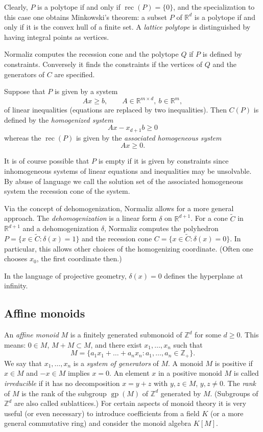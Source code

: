 \documentclass[12pt,a4paper]{scrartcl}
\theoremstyle{definition}
\def\ZZ{{\mathbb Z}}
\def\RR{{\mathbb R}}
\DeclareMathOperator{\gp}{gp}
\DeclareMathOperator{\rec}{rec}
\begin{document}
Clearly, $P$ is a polytope if and only if $\rec(P)=\{0\}$, and the specialization to this case one obtains Minkowski's theorem: a subset $P$ of $\RR^d$ is a polytope if and only if it is the convex hull of a finite set. A \emph{lattice polytope} is distinguished by having integral points as vertices.

Normaliz computes the recession cone and the polytope $Q$ if $P$ is defined by constraints. Conversely it finds the constraints if the vertices of $Q$ and the generators of $C$ are specified.

Suppose that $P$ is given by a system
$$
Ax\ge b, \qquad A\in\RR^{m\times d},\ b\in \RR^m,
$$
of linear inequalities (equations are replaced by two inequalities). Then $C(P)$ is defined by the \emph{homogenized system}
$$
Ax-x_{d+1}b\ge 0
$$
whereas the $\rec(P)$ is given by the \emph{associated homogeneous system}
$$
Ax\ge 0.
$$

It is of course possible that $P$ is empty if it is given by constraints since inhomogeneous systems of linear equations and inequalities may be unsolvable. By abuse of language we call the solution set of the associated homogeneous system the recession cone of the system.

Via the concept of dehomogenization, Normaliz allows for a more general approach. The \emph{dehomogenization} is a linear form $\delta$ on $\RR^{d+1}$. For a cone $\widetilde C$ in $\RR^{d+1}$ and a dehomogenization $\delta$, Normaliz computes the polyhedron $P=\{x\in \widetilde C: \delta(x)=1\}$ and the recession cone $C=\{x\in \widetilde C: \delta(x)=0\}$. In particular, this allows other choices of the homogenizing coordinate. (Often one chooses $x_0$, the first coordinate then.)

In the language of projective geometry, $\delta(x)=0$ defines the hyperplane at infinity.

\subsection{Affine monoids}

An \emph{affine monoid} $M$ is a finitely generated submonoid of $\ZZ^d$ for some $d\ge0$. This means: $0\in M$, $M+M\subset M$, and there exist $x_1,\dots,x_n$ such that
$$
M=\{a_1x_1+\dots+a_nx_n: a_1,\dots,a_n\in\ZZ_+\}.
$$
We say that $x_1,\dots,x_n$ is a \emph{system of generators} of $M$. A monoid $M$ is positive if $x\in M$ and $-x\in M$ implies $x=0$.  An element $x$ in a positive monoid $M$ is called \emph{irreducible} if it has no decomposition $x=y+z$ with $y,z\in M$, $y,z\neq0$. The \emph{rank} of $M$ is the rank of the subgroup $\gp(M)$ of $\ZZ^d$ generated by $M$. (Subgroups of $\ZZ^d$ are also called sublattices.)
For certain aspects of monoid theory it is very useful (or even necessary) to introduce coefficients from a field $K$ (or a more general commutative ring) and consider the monoid algebra $K[M]$.
\end{document}
